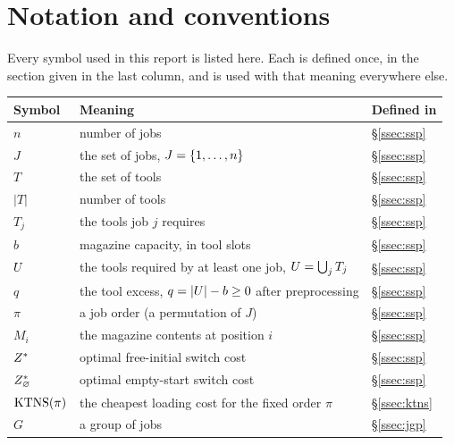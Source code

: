 \section*{Notation and conventions}
\label{sec:notation}

Every symbol used in this report is listed here. Each is defined once, in the
section given in the last column, and is used with that meaning everywhere else.

\medskip
\noindent\begin{tabular}{@{}l>{\raggedright\arraybackslash}p{8.9cm}l@{}}
\toprule
Symbol & Meaning & Defined in \\
\midrule
$n$              & number of jobs                                              & \S\ref{ssec:ssp} \\
$J$              & the set of jobs, $J=\{1,\dots,n\}$                        & \S\ref{ssec:ssp} \\
$T$              & the set of tools                                            & \S\ref{ssec:ssp} \\
$\lvert T\rvert$ & number of tools                                             & \S\ref{ssec:ssp} \\
$T_j$            & the tools job $j$ requires                                   & \S\ref{ssec:ssp} \\
$b$              & magazine capacity, in tool slots                            & \S\ref{ssec:ssp} \\
$U$             & the tools required by at least one job, $U=\bigcup_j T_j$   & \S\ref{ssec:ssp} \\
  $q$              & the tool excess, $q=\lvert U\rvert-b\ge0$ after preprocessing & \S\ref{ssec:ssp} \\
$\pi$            & a job order (a permutation of $J$)                           & \S\ref{ssec:ssp} \\
$M_i$            & the magazine contents at position $i$                        & \S\ref{ssec:ssp} \\
  $Z^{\ast}$           & optimal free-initial switch cost                              & \S\ref{ssec:ssp} \\
  $Z^{\ast}_{\varnothing}$        & optimal empty-start switch cost                               & \S\ref{ssec:ssp} \\
$\operatorname{KTNS}(\pi)$     & the cheapest loading cost for the fixed order $\pi$          & \S\ref{ssec:ktns} \\
$G$              & a group of jobs                                             & \S\ref{ssec:jgp} \\

\end{tabular}
